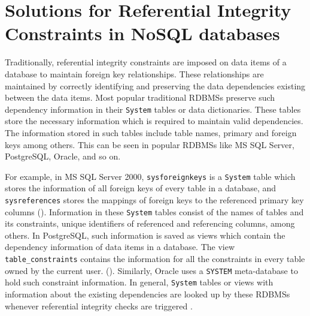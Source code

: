 \chapter{Solutions for Referential Integrity Constraints in NoSQL
databases}
\label{c:solutions}

Traditionally, referential
integrity constraints are imposed on data items of a database to maintain
foreign key relationships. These relationships are
 maintained by correctly identifying and preserving the data dependencies 
 existing between the data items.
Most popular traditional \acp{RDBMS}
preserve such dependency information in their \texttt{System} tables or data
dictionaries.  These tables store the necessary information  which is required
to maintain valid dependencies. The information stored in such tables include table
names,  primary and foreign keys among others.
This can be seen in popular \acp{RDBMS} like  MS SQL Server,  PostgreSQL,
Oracle, and so on.  

For example,  in MS SQL Server 2000, \texttt{sysforeignkeys}
is a \texttt{System} table which stores the information of all 
foreign keys of every table in a database, and \texttt{sysreferences}
stores the mappings of  foreign keys to the referenced primary key columns
().
Information in these \texttt{System} tables consist of  the
names of tables and its constraints,  unique identifiers of 
referenced and referencing columns,  among others. 
In PostgreSQL, such information is saved as views which contain the dependency
information of data items in a database.
The view \texttt{table\_constraints} contains the information for all the
constraints in every table owned by the current user. (\todo{\cite{}}). 
Similarly, Oracle uses a \texttt{SYSTEM} meta-database to hold such constraint
information.
 In general, \texttt{System} tables or views with information
about the existing dependencies  are looked up by these \acp{RDBMS} whenever
referential integrity checks are triggered \citep{sys:msdn}.


